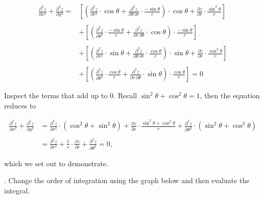 \documentclass{article}
\begin{document}
\begin{align*}\frac{\partial^2 z}{\partial x^2}+\frac{\partial^2 z}{\partial y^2}=&\left[\left(\frac{\partial^2z}{\partial r^2}\cdot\cos\theta +\frac{\partial^2z}{\partial\theta\,\partial r}\cdot\frac{-\sin\theta}{r}\right)\cdot\cos\theta+\frac{\partial z}{\partial r}\cdot\frac{\sin^2\theta}{r}\right]\\\\&+\left[\left(\frac{\partial^2z}{\partial\theta^2}\cdot\frac{-\sin\theta}{r} + \frac{\partial^2z}{\partial r\,\partial\theta}\cdot\cos\theta\right)\cdot\frac{-\sin\theta}{r}\right]\\\\&+\left[\left(\frac{\partial^2z}{\partial r^2}\cdot\sin\theta +\frac{\partial^2z}{\partial\theta\,\partial r}\cdot\frac{\cos\theta}{r}\right)\cdot\sin\theta+\frac{\partial z}{\partial r}\cdot\frac{\cos^2\theta}{r}\right]\\\\&+\left[\left(\frac{\partial^2z}{\partial\theta^2}\cdot\frac{\cos\theta}{r} + \frac{\partial^2z}{\partial r\,\partial\theta}\cdot\sin\theta\right)\cdot\frac{\cos\theta}{r}\right]=0\end{align*}

\newpage

\noindent Inspect the terms that add up to $0$. Recall $\sin^2\theta+\cos^2\theta=1$, then the equation reduces to

\begin{align*}
\frac{\partial^2z}{\partial x^2}+\frac{\partial^2z}{\partial y^2}&=\frac{\partial^2z}{\partial r^2}\cdot\left(\cos^2\theta+\sin^2\theta\right)+\frac{\partial z}{\partial r}\cdot\frac{\sin^2\theta+\cos^2\theta}{r}+\frac{\partial^2z}{\partial\theta^2}\cdot\left(\sin^2\theta+\cos^2\theta\right)\\\\&=\frac{\partial^2z}{\partial r^2}+\frac1r\cdot\frac{\partial z}{\partial r}+\frac{\partial^2z}{\partial\theta^2}=0,
\end{align*}

\hfill

\noindent which we set out to demonstrate.

\hfill

. Change the order of integration using the graph below and then evaluate the integral.
\end{document}
